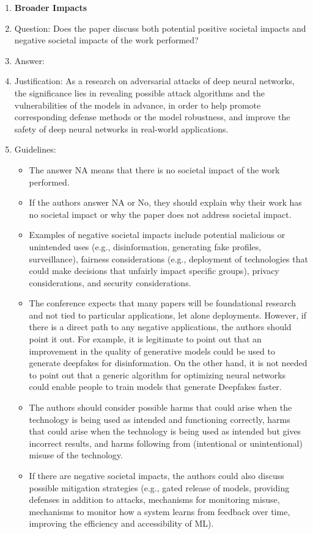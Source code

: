 \documentclass{article}
\begin{document}
\begin{enumerate}
\item {\bf Broader Impacts}
    \item[] Question: Does the paper discuss both potential positive societal impacts and negative societal impacts of the work performed?
    \item[] Answer: \answerYes{} %
    \item[] Justification: As a research on adversarial attacks of deep neural networks, the significance lies in revealing possible attack algorithms and the vulnerabilities of the models in advance, in order to help promote corresponding defense methods or the model robustness, and improve the safety of deep neural networks in real-world applications.
    \item[] Guidelines:
    \begin{itemize}
        \item The answer NA means that there is no societal impact of the work performed.
        \item If the authors answer NA or No, they should explain why their work has no societal impact or why the paper does not address societal impact.
        \item Examples of negative societal impacts include potential malicious or unintended uses (e.g., disinformation, generating fake profiles, surveillance), fairness considerations (e.g., deployment of technologies that could make decisions that unfairly impact specific groups), privacy considerations, and security considerations.
        \item The conference expects that many papers will be foundational research and not tied to particular applications, let alone deployments. However, if there is a direct path to any negative applications, the authors should point it out. For example, it is legitimate to point out that an improvement in the quality of generative models could be used to generate deepfakes for disinformation. On the other hand, it is not needed to point out that a generic algorithm for optimizing neural networks could enable people to train models that generate Deepfakes faster.
        \item The authors should consider possible harms that could arise when the technology is being used as intended and functioning correctly, harms that could arise when the technology is being used as intended but gives incorrect results, and harms following from (intentional or unintentional) misuse of the technology.
        \item If there are negative societal impacts, the authors could also discuss possible mitigation strategies (e.g., gated release of models, providing defenses in addition to attacks, mechanisms for monitoring misuse, mechanisms to monitor how a system learns from feedback over time, improving the efficiency and accessibility of ML).
    \end{itemize}
    

\end{enumerate}
\end{document}
